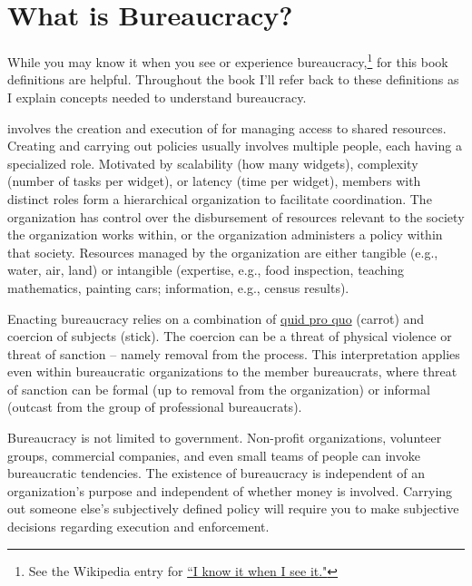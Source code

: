 \section{What is Bureaucracy?\label{sec:define-bureaucracy}}

While you may know it when you see or experience bureaucracy,\footnote{See the Wikipedia entry for \href{https://en.wikipedia.org/wiki/I_know_it_when_I_see_it}{``I know it when I see it."}} 
for this book definitions are helpful. Throughout the book I'll refer back to these definitions as I explain concepts needed to understand bureaucracy.

\iftoggle{glossarysubstitutionworks}{\Gls{bureaucracy}}{Bureaucracy}
involves the creation and execution of 
\iftoggle{glossarysubstitutionworks}{\glspl{policy}}{policies} for managing access to shared resources. 
Creating and carrying out policies usually involves multiple people, each having a specialized role. Motivated by scalability (how many widgets), complexity (number of tasks per widget), or latency (time per widget), members with distinct roles form a hierarchical organization to facilitate coordination. The organization has control over the disbursement of resources relevant to the society the organization works within, or the organization administers a policy within that society. Resources managed by the organization are either tangible (e.g., water, air, land) or intangible (expertise, e.g., food inspection, teaching mathematics, painting cars; information, e.g., census results).  

Enacting bureaucracy relies on a combination of \href{https://en.wikipedia.org/wiki/Quid_pro_quo}{quid pro quo}
(carrot) and coercion of subjects (stick). The coercion can be a threat of physical violence or threat of sanction -- namely removal from the process. This interpretation applies even within bureaucratic organizations to the member bureaucrats, where threat of sanction can be formal (up to removal from the organization) or informal (outcast from the group of professional bureaucrats).

Bureaucracy is not limited to government. Non-profit organizations, volunteer groups, commercial companies, and even small teams of people can invoke bureaucratic tendencies. The existence of bureaucracy is independent of an organization's purpose and independent of whether money is involved. Carrying out someone else's subjectively defined policy will require you to make subjective decisions regarding execution and enforcement. 

